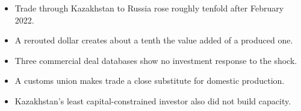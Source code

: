 \documentclass{article}
\begin{document}
\begin{itemize}
\item Trade through Kazakhstan to Russia rose roughly tenfold after February 2022.
\item A rerouted dollar creates about a tenth the value added of a produced one.
\item Three commercial deal databases show no investment response to the shock.
\item A customs union makes trade a close substitute for domestic production.
\item Kazakhstan's least capital-constrained investor also did not build capacity.
\end{itemize}
\end{document}
